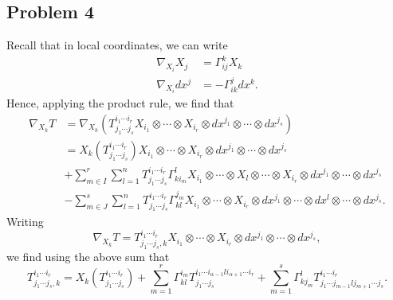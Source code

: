 \documentclass{../mathnotes}
\begin{document}
\subsection*{Problem 4}
Recall that in local coordinates, we can write
\begin{align*}
    \nabla_{X_i}X_j &= \Gamma_{ij}^kX_k\\
    \nabla_{X_i}dx^j &= -\Gamma_{ik}^jdx^k.
\end{align*}
Hence, applying the product rule, we find that
\begin{align*}
    \nabla_{X_k}T &= \nabla_{X_k}\left( T^{i_1\cdots i_r}_{j_1\cdots j_s} X_{i_1}\otimes\cdots\otimes X_{i_r}\otimes dx^{j_1}\otimes\cdots\otimes dx^{j_s}\right)\\
    &= X_k(T^{i_1\cdots i_r}_{j_1\cdots j_s}) X_{i_1}\otimes\cdots\otimes X_{i_r}\otimes dx^{j_1}\otimes\cdots\otimes dx^{j_s}\\
    &+ \sum_{m\in I}^r\sum_{l=1}^n T^{i_1\cdots i_r}_{j_1\cdots j_s} \Gamma_{ki_m}^lX_{i_1}\otimes\cdots\otimes X_l\otimes \cdots\otimes X_{i_r}\otimes dx^{j_1}\otimes\cdots\otimes dx^{j_s}\\
    &- \sum_{m\in J}^s\sum_{l=1}^n T^{i_1\cdots i_r}_{j_1\cdots j_s} \Gamma_{kl}^{j_m}X_{i_1}\otimes\cdots\otimes X_{i_r}\otimes dx^{j_1}\otimes\cdots\otimes dx^l\otimes\cdots\otimes dx^{j_s}.
\end{align*}
Writing
\[\nabla_{X_k}T=T_{j_1\cdots j_s,k}^{i_1\cdots i_r}X_{i_1}\otimes\cdots\otimes X_{i_r}\otimes dx^{j_1}\otimes\cdots\otimes dx^{j_s},\]
we find using the above sum that
\[T_{j_1\cdots j_s,k}^{i_1\cdots i_r} = X_k(T_{j_1\cdots j_s}^{i_1\cdots i_r})+\sum_{m=1}^r\Gamma_{kl}^{i_m}T_{j_1\cdots j_s}^{i_1\cdots i_{\alpha-1}li_{\alpha+1}\cdots i_r}
    +\sum_{m=1}^s\Gamma^l_{kj_m}T^{i_1\cdots i_r}_{j_1\cdots j_{m-1}lj_{m+1}\cdots j_s}.\]
\end{document}
